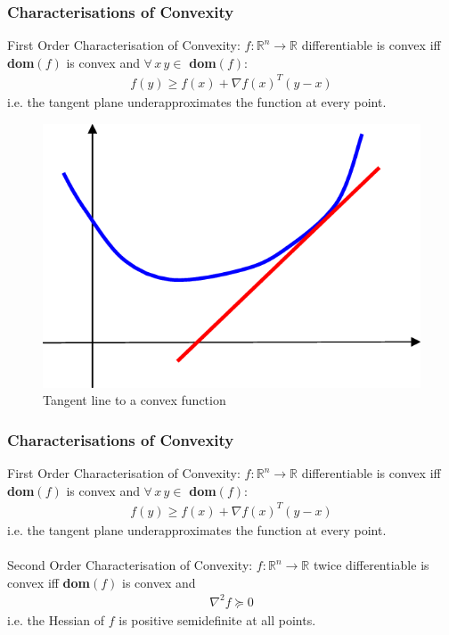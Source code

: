 \documentclass{beamer}
\def\rnum{\mathbb{R}}
\begin{document}
\begin{frame}
    \frametitle{Characterisations of Convexity}
    First Order Characterisation of Convexity: $f : \rnum^{n} \rightarrow \rnum$
    differentiable is convex iff \textbf{dom}$(f)$ is convex and $\forall \, x
    \, y \in$ \textbf{dom}$(f)$:
    \begin{align*}
        f(y) \geq f(x) + \nabla f(x)^{T}(y-x)
    \end{align*}
    i.e. the tangent plane underapproximates the function at every point.
    \begin{figure}[t]
        \centering
        \includegraphics[scale=0.2]{tangent}
        \caption{Tangent line to a convex function}
        \label{fig:tangent}
    \end{figure}
\end{frame}

\begin{frame}
    \frametitle{Characterisations of Convexity}
    First Order Characterisation of Convexity: $f : \rnum^{n} \rightarrow \rnum$
    differentiable is convex iff \textbf{dom}$(f)$ is convex and $\forall \, x
    \, y \in$ \textbf{dom}$(f)$:
    \begin{align*}
        f(y) \geq f(x) + \nabla f(x)^{T}(y-x)
    \end{align*}
    i.e. the tangent plane underapproximates the function at every point.
    \\~\\
    Second Order Characterisation of Convexity: $f : \rnum^{n} \rightarrow
    \rnum$ twice differentiable is convex iff \textbf{dom}$(f)$ is convex and
    \begin{align*}
        \nabla^{2}f \succeq 0
    \end{align*}
    i.e. the Hessian of $f$ is positive semidefinite at all points.
\end{frame}
\end{document}
